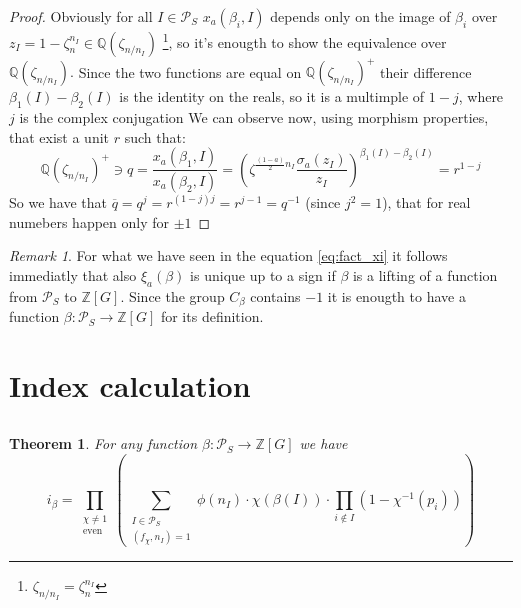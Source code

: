 \documentclass[]{article}
\theoremstyle{plain}
\newtheorem{teo}{Theorem}[section]
\theoremstyle{remark}
\newtheorem{rem}{Remark}
\theoremstyle{definition}
\newcommand{\PS}{\mathcal{P}_S}
\newcommand{\Z}{\mathbb{Z}}
\newcommand{\Q}{\mathbb{Q}}
\begin{document}
	\begin{proof}
		Obviously for all $ I \in \PS $ $ 	x_a(\beta_i , I) $ depends only on the image of $ \beta_i $ over $ z_I = 1- \zeta_n ^{n_I} \in \Q(\zeta_{n/n_I}) $ \footnote{ $ \zeta_{n/n_I} =  \zeta_n^{n_I} $}, so it's enougth to show the equivalence over $  \Q(\zeta_{n/n_I}). $ Since the two functions are equal on $ \Q(\zeta_{n/n_I})^+ $ their difference $ \beta_1(I) - \beta_2 (I)  $ is the identity on the reals, so it is a multimple of $ 1 - j $, where $ j $ is the complex conjugation %
		We can observe now, using morphism properties, that exist a unit $ r $ such that:
		\begin{equation*}
			\Q (\zeta_{n/n_I})^+ \ni q = \frac{x_a(\beta_1 , I)}{x_a(\beta_2 , I)} = {\left( \zeta ^{\frac{(1-a)}{2} n_I } \frac{\sigma_a (	z_I )}{z_I } \right)  }^{\beta_1(I) - \beta_2 (I)} = r ^{1-j}
		\end{equation*}	
		So we have that $ \overline{q}=q^j = r^{(1-j)j} = r^{j  - 1 }= q^{-1}$ (since $j^2 = 1 $), that for real numebers happen only for $ \pm 1 $
	\end{proof}

	\begin{rem}
		For what we have seen in the equation \ref{eq:fact_xi} it follows immediatly that also $ \xi_a(\beta) $ is unique up to a sign if $\beta$ is a lifting of a function from $ \PS $ to $ \Z[G] $. Since the group $ C_\beta $ contains $ -1 $ it is enougth to have a function $ \beta : \PS \to \Z[G]$ for its definition.
	\end{rem}

	\section{Index calculation}
	\subsection*{}
	\begin{teo}
		\label{teo:idx1}
		For any function $ \beta : \PS \to \Z [G] $ we have
		\begin{equation}
		\label{eq:idx1}
			i_\beta = \prod_{ \substack{\chi \neq 1 \\ \text{even}}} \left( \sum_{\substack{ I \in \PS \\ (f_\chi , n_I) = 1}} \phi (n_I) \cdot \chi (\beta (I)) \cdot \prod_{i \not \in  I} (1- \chi^{-1} (p_i)) \right) 
		\end{equation}
	\end{teo}
\end{document}
